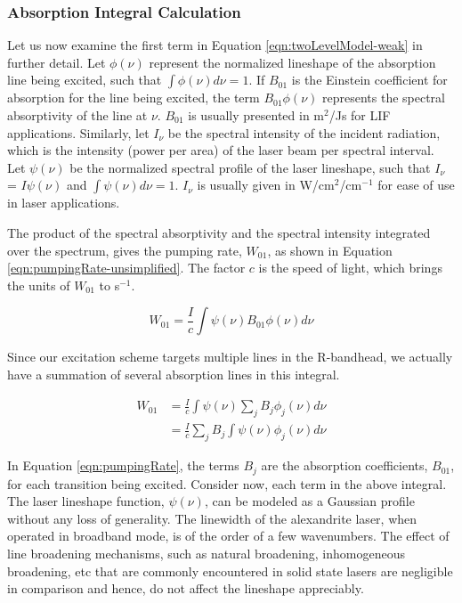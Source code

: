 \subsubsection{Absorption Integral Calculation}
\label{subsubsec:basic-model-absorption-integral-calculation}

Let us now examine the first term in Equation \ref{eqn:twoLevelModel-weak} in further detail.
Let \(\phi(\nu)\) represent the normalized lineshape of the absorption line being excited, such that \(\int \phi(\nu) d\nu = 1\).
If \(B_{01}\) is the Einstein coefficient for absorption for the line being excited, the term \(B_{01}\phi(\nu)\) represents the spectral absorptivity of the line at \(\nu\).
\(B_{01}\) is usually presented in m\(^2\)/Js for LIF applications.
Similarly, let \(I_\nu\) be the spectral intensity of the incident radiation, which is the intensity (power per area) of the laser beam per spectral interval.
Let \(\psi(\nu)\) be the normalized spectral profile of the laser lineshape, such that \(I_\nu\) = \(I \psi(\nu)\) and \(\int \psi(\nu) d\nu = 1\).
\(I_\nu\) is usually given in W/cm\(^2\)/cm\(^{-1}\) for ease of use in laser applications.

The product of the spectral absorptivity and the spectral intensity integrated over the spectrum, gives the pumping rate, \(W_{01}\), as shown in Equation \ref{eqn:pumpingRate-unsimplified}.
The factor \(c\) is the speed of light, which brings the units of \(W_{01}\) to s\(^{-1}\).

\begin{equation}
  W_{01} = \frac{I}{c} \int \psi(\nu) B_{01}\phi(\nu) d\nu
  \label{eqn:pumpingRate-unsimplified}
\end{equation}

Since our excitation scheme targets multiple lines in the R-bandhead, we actually have a summation of several absorption lines in this integral.

\begin{align}
  W_{01} & = \frac{I}{c} \int \psi(\nu) \sum_j B_j \phi_j (\nu) d\nu \nonumber \\
        & = \frac{I}{c} \sum_j B_j \int \psi(\nu)\phi_j(\nu) d\nu
  \label{eqn:pumpingRate}
\end{align}

In Equation \ref{eqn:pumpingRate}, the terms \(B_j\) are the absorption coefficients, \(B_{01}\), for each transition being excited.
Consider now, each term in the above integral.
The laser lineshape function, \(\psi(\nu)\), can be modeled as a Gaussian profile without any loss of generality.
The linewidth of the alexandrite laser, when operated in broadband mode, is of the order of a few wavenumbers.
The effect of line broadening mechanisms, such as natural broadening, inhomogeneous broadening, etc that are commonly encountered in solid state lasers are negligible in comparison and hence, do not affect the lineshape appreciably.

